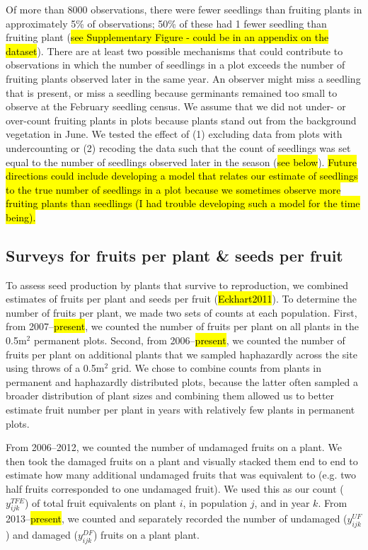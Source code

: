 \documentclass[12pt, oneside, titlepage]{article}   	%
\begin{document}
Of more than 8000 observations, there were fewer seedlings than fruiting plants in approximately 5\% of observations; 50\% of these had 1 fewer seedling than fruiting plant (\hl{see Supplementary Figure - could be in an appendix on the dataset}). There are at least two possible mechanisms that could contribute to observations in which the number of seedlings in a plot exceeds the number of fruiting plants observed later in the same year. An observer might miss a seedling that is present, or miss a seedling because germinants remained too small to observe at the February seedling census. We assume that we did not under- or over-count fruiting plants in plots because plants stand out from the background vegetation in June. We tested the effect of (1) excluding data from plots with undercounting or (2) recoding the data such that the count of seedlings was set equal to the number of seedlings observed later in the season (\hl{see below}). \hl{Future directions could include developing a model that relates our estimate of seedlings to the true number of seedlings in a plot because we sometimes observe more fruiting plants than seedlings (I had trouble developing such a model for the time being).}

\subsection{Surveys for fruits per plant \& seeds per fruit}

To assess seed production by plants that survive to reproduction, we combined estimates of fruits per plant and seeds per fruit (\hl{Eckhart2011}). To determine the number of fruits per plant, we made two sets of counts at each population. First, from 2007--\hl{present}, we counted the number of fruits per plant on all plants in the 0.5m$^2$ permanent plots. Second, from 2006--\hl{present}, we counted the number of fruits per plant on additional plants that we sampled haphazardly across the site using throws of a 0.5m$^2$ grid. We chose to combine counts from plants in permanent and haphazardly distributed plots, because the latter often sampled a broader distribution of plant sizes and combining them allowed us to better estimate fruit number per plant in years with relatively few plants in permanent plots. 

From 2006--2012, we counted the number of undamaged fruits on a plant. We then took the damaged fruits on a plant and visually stacked them end to end to estimate how many additional undamaged fruits that was equivalent to (e.g. two half fruits corresponded to one undamaged fruit). We used this as our count ($y^{TFE}_{ijk}$) of total fruit equivalents on plant $i$, in population $j$, and in year $k$. From 2013--\hl{present}, we counted and separately recorded the number of undamaged ($y^{UF}_{ijk}$) and damaged ($y^{DF}_{ijk}$) fruits on a plant plant. 
\end{document}
